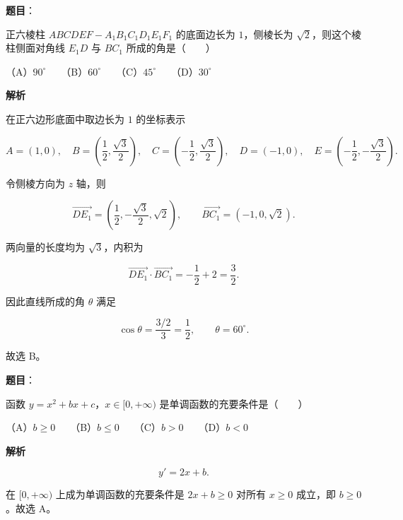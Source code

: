 \begin{answer}

\textbf{题目}：

正六棱柱 $ABCDEF-A_1B_1C_1D_1E_1F_1$ 的底面边长为 $1$，侧棱长为 $\sqrt2$，则这个棱柱侧面对角线 $E_1D$ 与 $BC_1$ 所成的角是\mbox{（　　）}

（A）$90^\circ$　　（B）$60^\circ$　　（C）$45^\circ$　　（D）$30^\circ$

\textbf{解析}

在正六边形底面中取边长为 $1$ 的坐标表示

\nopagebreak[4]
\[
A=(1,0),\quad
B=\left(\frac12,\frac{\sqrt3}{2}\right),\quad
C=\left(-\frac12,\frac{\sqrt3}{2}\right),\quad
D=(-1,0),\quad
E=\left(-\frac12,-\frac{\sqrt3}{2}\right).
\]

令侧棱方向为 $z$ 轴，则

\nopagebreak[4]
\[
\overrightarrow{DE_1}
=\left(\frac12,-\frac{\sqrt3}{2},\sqrt2\right),
\qquad
\overrightarrow{BC_1}=(-1,0,\sqrt2).
\]

两向量的长度均为 $\sqrt3$，内积为

\nopagebreak[4]
\[
\overrightarrow{DE_1}\cdot\overrightarrow{BC_1}
=-\frac12+2=\frac32.
\]

因此直线所成的角 $\theta$ 满足

\nopagebreak[4]
\[
\cos\theta=\frac{3/2}{3}=\frac12,
\qquad\theta=60^\circ.
\]

故选 B。


\end{answer}
\begin{answer}

\textbf{题目}：

函数 $y=x^2+bx+c$，$x\in[0,+\infty)$ 是单调函数的充要条件是\mbox{（　　）}

（A）$b\geqslant0$　　（B）$b\leqslant0$　　（C）$b>0$　　（D）$b<0$

\textbf{解析}

\nopagebreak[4]
\[
y'=2x+b.
\]

在 $[0,+\infty)$ 上成为单调函数的充要条件是 $2x+b\geqslant0$ 对所有 $x\geqslant0$ 成立，即 $b\geqslant0$。故选 A。


\end{answer}
